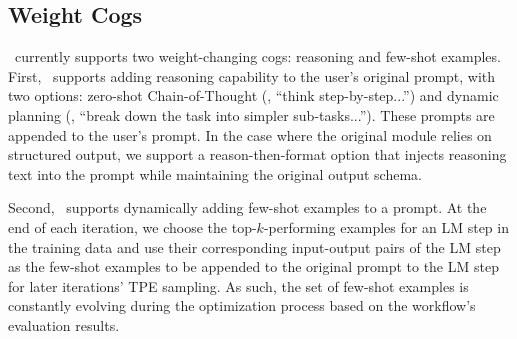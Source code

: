 \subsection{Weight Cogs}
\sysname\ currently supports two weight-changing cogs: reasoning and few-shot examples.
First, \sysname\ supports adding reasoning capability to the user's original prompt, with two options: zero-shot Chain-of-Thought \cite{wei2022chain} (\ie, ``think step-by-step...'') and dynamic planning \cite{huang2022language} (\ie, ``break down the task into simpler sub-tasks...''). These prompts are appended to the user's prompt. In the case where the original module relies on structured output, we support a reason-then-format option that injects reasoning text into the prompt while maintaining the original output schema.

Second, \sysname\ supports dynamically adding few-shot examples to a prompt. At the end of each iteration, we choose the top-$k$-performing examples for an LM step in the training data and use their corresponding input-output pairs of the LM step as the few-shot examples to be appended to the original prompt to the LM step for later iterations' TPE sampling. As such, the set of few-shot examples is constantly evolving during the optimization process based on the workflow's evaluation results. 


